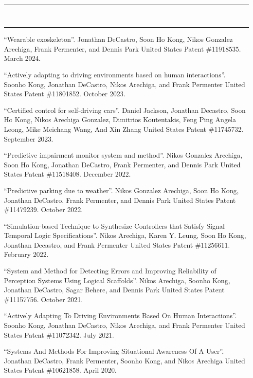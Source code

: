 \documentclass[10pt, letterpaper]{article}
\newcommand{\mysection}[1]{
  \vspace{20pt}\noindent{\rmfamily\mdseries \Large #1}\\
  \vspace{-6pt}\hrule\vspace{3pt}
}
\begin{document}

\mysection{Publications}


\nocite{*}
\printbibliography[heading=none]

\mysection{Patents}

\begin{thebibliography}{9}

 ``Wearable exoskeleton''.
Jonathan DeCastro, Soon Ho Kong, Nikos Gonzalez Arechiga, Frank Permenter, and Dennis Park
United States Patent \#11918535. March 2024.

 ``Actively adapting to driving environments based on human interactions''.
Soonho Kong, Jonathan DeCastro, Nikos Arechiga, and Frank Permenter
United States Patent \#11801852. October 2023.

``Certified control for self-driving cars''.
Daniel Jackson, Jonathan Decastro, Soon Ho Kong, Nikos Arechiga Gonzalez, Dimitrios Koutentakis, Feng Ping Angela Leong, Mike Meichang Wang, And Xin Zhang
United States Patent \#11745732. September 2023.

``Predictive impairment monitor system and method''.
Nikos Gonzalez Arechiga, Soon Ho Kong, Jonathan DeCastro, Frank Permenter, and Dennis Park
United States Patent \#11518408. December 2022.

``Predictive parking due to weather''.
Nikos Gonzalez Arechiga, Soon Ho Kong, Jonathan DeCastro, Frank Permenter, and Dennis Park
United States Patent \#11479239. October 2022.

``Simulation-based Technique to Synthesize Controllers that Satisfy Signal Temporal Logic Specifications''.
Nikos Arechiga, Karen Y. Leung, Soon Ho Kong, Jonathan Decastro, and Frank Permenter
United States Patent \#11256611. February 2022.

``System and Method for Detecting Errors and Improving Reliability of Perception Systems Using Logical Scaffolds''.
Nikos Arechiga, Soonho Kong, Jonathan DeCastro, Sagar Behere, and Dennis Park
United States Patent \#11157756. October 2021.

``Actively Adapting To Driving Environments Based On Human Interactions''.
Soonho Kong, Jonathan DeCastro, Nikos Arechiga, and Frank Permenter
United States Patent \#11072342. July 2021.

 ``Systems And Methods For Improving Situational Awareness Of A User''.
Jonathan DeCastro, Frank Permenter, Soonho Kong, and Nikos Arechiga
United States Patent \#10621858. April 2020.

\end{thebibliography}
\end{document}
